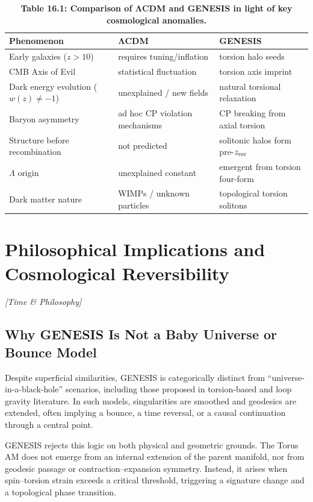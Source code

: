 \documentclass{article}
\newcommand{\timetag}{\textcolor{orange!80!black}{\textit{[Time \& Philosophy]}}}
\begin{document}
\begin{table}[h!]
\centering
\renewcommand{\arraystretch}{1.4}
\caption*{\textbf{Table 16.1: Comparison of ΛCDM and GENESIS in light of key cosmological anomalies.}}
\begin{tabular}{|p{5.2cm}|p{4.8cm}|p{4.8cm}|}
\hline
\textbf{Phenomenon} & \textbf{ΛCDM} & \textbf{GENESIS} \\
\hline
Early galaxies ($z > 10$) & requires tuning/inflation & torsion halo seeds \\
\hline
CMB Axis of Evil & statistical fluctuation & torsion axis imprint \\
\hline
Dark energy evolution ($w(z) \ne -1$) & unexplained / new fields & natural torsional relaxation \\
\hline
Baryon asymmetry & ad hoc CP violation mechanisms & CP breaking from axial torsion \\
\hline
Structure before recombination & not predicted & solitonic halos form pre-$z_{\rm rec}$ \\
\hline
$\Lambda$ origin & unexplained constant & emergent from torsion four-form \\
\hline
Dark matter nature & WIMPs / unknown particles & topological torsion solitons \\
\hline
\end{tabular}
\end{table}




\section{Philosophical Implications and Cosmological Reversibility} 
\timetag

\subsection{Why GENESIS Is Not a Baby Universe or Bounce Model}

Despite superficial similarities, GENESIS is categorically distinct from “universe-in-a-black-hole” scenarios, including those proposed in torsion‑based and loop gravity literature. In such models, singularities are smoothed and geodesics are extended, often implying a bounce, a time reversal, or a causal continuation through a central point.

GENESIS rejects this logic on both physical and geometric grounds. The Torus AM does not emerge from an internal extension of the parent manifold, nor from geodesic passage or contraction–expansion symmetry. Instead, it arises when spin–torsion strain exceeds a critical threshold, triggering a signature change and a topological phase transition.
\end{document}
